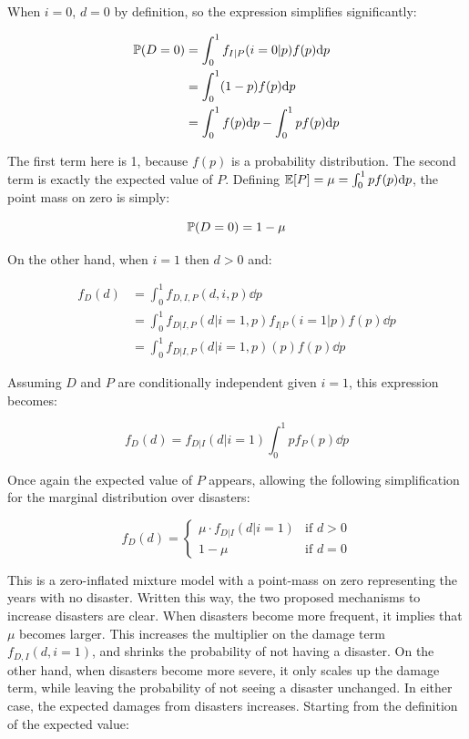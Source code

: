 When $i = 0$, $d = 0$ by definition, so the expression simplifies significantly:

\begin{align}
\mathbb{P}(D = 0) &= \int_0^1 f_{I|P}(i = 0|p) f(p) \mathrm{d} p \\
&= \int_0^1 (1 - p) f(p) \mathrm{d} p \\
&= \int_0^1 f(p) \mathrm{d} p - \int_0^1 p f(p) \mathrm{d} p
\end{align}

The first term here is 1, because $f(p)$ is a probability distribution. The second term is exactly the expected value of $P$. Defining $\mathbb{E}[P] = \mu = \int_0^1 p f(p) \mathrm{d} p$, the point mass on zero is simply:

\begin{equation}
\mathbb{P}(D = 0) = 1 - \mu
\end{equation}

On the other hand, when $i = 1$ then $d > 0$ and:

\begin{align}
f_D(d) &= \int_0^1 f_{D, I, P}(d, i, p) \dd p \\
&= \int_0^1 f_{D|I, P}(d|i=1, p) f_{I|P}(i=1|p) f(p) \dd p \\
&= \int_0^1 f_{D|I, P}(d|i=1, p) (p) f(p) \dd p
\end{align}

Assuming $D$ and $P$ are conditionally independent given $i=1$, this expression becomes:

\begin{equation}
f_D(d) = f_{D|I}(d|i = 1) \int_0^1 p f_P(p) \dd p
\end{equation}

Once again the expected value of $P$ appears, allowing the following simplification for the marginal distribution over disasters:

\begin{equation}
f_D(d) = \begin{cases} \mu \cdot f_{D|I}(d|i = 1) & \text{if } d > 0 \\ 1 - \mu & \text{if } d = 0 \end{cases}
\end{equation}

This is a zero-inflated mixture model with a point-mass on zero representing the years with no disaster. Written this way, the two proposed mechanisms to increase disasters are clear. When disasters become more frequent, it implies that $\mu$ becomes larger. This increases the multiplier on the damage term $f_{D,I}(d, i=1)$, and shrinks the probability of not having a disaster. On the other hand, when disasters become more severe, it only scales up the damage term, while leaving the probability of not seeing a disaster unchanged. In either case, the expected damages from disasters increases. Starting from the definition of the expected value:


